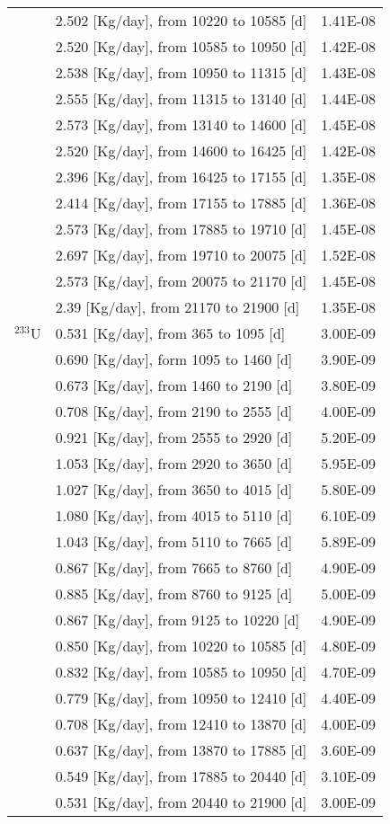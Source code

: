 \begin{table}[ht!]
\begin{tabularx}{\textwidth}{|p{1.5cm}|b|p{1.9cm}|}
		& 2.502  [Kg/day], from 10220 to 10585 [d]&		1.41E-08	 \\
		& 2.520  [Kg/day], from 10585 to 10950 [d]&		1.42E-08	 \\
		&  2.538  [Kg/day], from 10950 to 11315 [d]&		1.43E-08	 \\
		&  2.555  [Kg/day], from 11315 to 13140 [d]&		1.44E-08	 \\
		&  2.573  [Kg/day], from 13140 to 14600 [d]&		1.45E-08	 \\
		&  2.520  [Kg/day], from 14600 to 16425 [d]&		1.42E-08	 \\
		& 2.396  [Kg/day], from 16425 to 17155 [d]&		1.35E-08	 \\
		&  2.414 [Kg/day], from 17155 to 17885 [d]&		1.36E-08	 \\
		& 2.573 [Kg/day], from 17885 to 19710 [d]&		1.45E-08	 \\
		&  2.697 [Kg/day], from 19710 to 20075 [d]&		1.52E-08	 \\
		&  2.573 [Kg/day], from 20075 to 21170 [d]&		1.45E-08	 \\
		&  2.39 [Kg/day], from 21170 to 21900 [d]&		1.35E-08	 \\
		\hline
		$^{233}$U &  0.531 [Kg/day], from 365 to 1095  [d]	&   3.00E-09  \\
		&  0.690 [Kg/day],  form 1095 to 1460 [d] &	3.90E-09 \\
		& 0.673 [Kg/day], from 1460 to 2190 [d] &	3.80E-09 \\
		& 0.708  [Kg/day], from 2190 to 2555 [d] &	4.00E-09 \\
		& 0.921  [Kg/day], from 2555 to 2920 [d] &	5.20E-09 \\
		&   1.053  [Kg/day], from 2920 to 3650 [d] &	5.95E-09 \\
		&  1.027 [Kg/day], from 3650 to 4015 [d] &	5.80E-09 \\
		&  1.080  [Kg/day], from 4015 to 5110 [d] &	6.10E-09 \\
		&  1.043  [Kg/day], from 5110 to 7665 [d] &	5.89E-09 \\
		&  0.867  [Kg/day], from 7665 to 8760 [d] &	4.90E-09 \\
		&  0.885  [Kg/day], from 8760 to 9125 [d] &	5.00E-09 \\
		&  0.867  [Kg/day], from 9125 to 10220 [d] &	4.90E-09 \\
		&  0.850 [Kg/day], from 10220 to 10585 [d] &	4.80E-09 \\
		& 0.832  [Kg/day], from 10585 to 10950 [d] &	4.70E-09 \\
		& 0.779   [Kg/day], from 10950 to 12410 [d] &	4.40E-09 \\
		& 0.708  [Kg/day], from 12410 to 13870 [d] &	4.00E-09 \\
		&  0.637  [Kg/day], from 13870 to 17885 [d] &	3.60E-09 \\
		&  0.549  [Kg/day], from 17885 to 20440 [d] &	3.10E-09 \\
		& 0.531 [Kg/day], from 20440 to 21900 [d] &	3.00E-09 \\
		\hline
	\end{tabularx}
	\label{tab:table9}
\end{table}	



